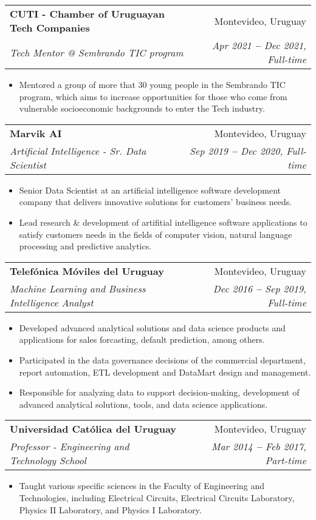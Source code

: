 \documentclass[letterpaper,11pt]{article}
\makeatletter
\newcommand{\resumeItem}[1]{
  \item\small{
    {#1 \vspace{-2pt}}
  }
}
\newcommand{\resumeSubheading}[4]{
  \vspace{-2pt}\item
  \begin{tabular*}{0.97\textwidth}[t]{l@{\extracolsep{\fill}}r}
    \textbf{#1} & #2 \\
    \textit{\small#3} & \textit{\small #4} \\
  \end{tabular*}\vspace{-7pt}
}
\newcommand{\resumeItemListStart}{\begin{itemize}}
\newcommand{\resumeItemListEnd}{\end{itemize}\vspace{-5pt}}
\makeatother
\begin{document}
        \resumeSubheading
            {CUTI - Chamber of Uruguayan Tech Companies}{Montevideo, Uruguay}
            {Tech Mentor @ Sembrando TIC program}{Apr 2021 \textbf{--} Dec 2021, Full-time}
            \resumeItemListStart
                \resumeItem{Mentored a group of more that 30 young people in the Sembrando TIC program, which aims to increase opportunities for those who come from vulnerable socioeconomic backgrounds to enter the Tech industry.}
            \resumeItemListEnd

        \resumeSubheading
            {Marvik AI}{Montevideo, Uruguay}
            {Artificial Intelligence - Sr. Data Scientist}{Sep 2019 \textbf{--} Dec 2020, Full-time}
            \resumeItemListStart
                \resumeItem{Senior Data Scientist at an artificial intelligence software development company that delivers innovative solutions for customers' business needs.}
                \resumeItem{Lead research \& development of artifitial intelligence software applications to satisfy customers needs in the fields of computer vision, natural language processing and predictive analytics.}
            \resumeItemListEnd

        \resumeSubheading
            {Telefónica Móviles del Uruguay}{Montevideo, Uruguay}
            {Machine Learning and Business Intelligence Analyst}{Dec 2016 \textbf{--} Sep 2019, Full-time}
            \resumeItemListStart
                \resumeItem{Developed advanced analytical solutions and data science products and applications for sales forcasting, default prediction, among others.}
                \resumeItem{Participated in the data governance decisions of the commercial department, report automation, ETL development and DataMart design and management.}
                \resumeItem{Responsible for analyzing data to support decision-making, development of advanced analytical solutions, tools, and data science applications.}
            \resumeItemListEnd

        \resumeSubheading
            {Universidad Católica del Uruguay}{Montevideo, Uruguay}
            {Professor - Engineering and Technology School}{Mar 2014 \textbf{--} Feb 2017, Part-time}
            \resumeItemListStart
                \resumeItem{Taught various specific sciences in the Faculty of Engineering and Technologies, including Electrical Circuits, Electrical Circuits Laboratory, Physics II Laboratory, and Physics I Laboratory.}
            \resumeItemListEnd
\end{document}
